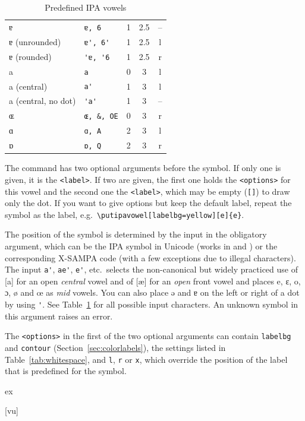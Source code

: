 \documentclass[a4paper,11pt]{article}
\newcommand\opt[1]{\texttt{#1}}
\begin{document}
\begin{table}[htbp]
\begin{longtable}{llccc}
		ɐ & \verb|ɐ, 6| & 1 & 2.5 & --\\
		ɐ (unrounded) & \verb|ɐ', 6'| & 1 & 2.5 & l\\
		ɐ (rounded) & \verb|'ɐ, '6| & 1 & 2.5 & r\\
		a & \verb|a| & 0 & 3 & l\\
		a (central) & \verb|a'| & 1 & 3 & l\\
		a (central, no dot) & \verb|'a'| & 1 & 3 & --\\
		ɶ & \verb|ɶ, &, OE| & 0 & 3 & r\\
		ɑ & \verb|ɑ, A| & 2 & 3 & l\\
		ɒ & \verb|ɒ, Q| & 2 & 3 & r\\
		\bottomrule
	\end{longtable}
	\caption{Predefined IPA vowels}
	\label{tab:ipavowels}
\end{table}

The command has two optional arguments before the symbol. If only one is given, it is the \texttt{<label>}. If two are given, the first one holds the \texttt{<options>} for this vowel and the second one the \texttt{<label>}, which may be empty (\verb|[]|) to draw only the dot. If you want to give options but keep the default label, repeat the symbol as the label, e.g.\ \verb|\putipavowel[labelbg=yellow][e]{e}|.

The position of the symbol is determined by the input in the obligatory argument, which can be the IPA symbol in Unicode (works in  and ) or the corresponding X-SAMPA code (with a few exceptions due to illegal characters).
The input \verb|a'|, \verb|ae'|, \verb|e'|, etc.\ selects the non-canonical but widely practiced use of [a] for an open \textit{central} vowel and of [æ] for an \textit{open} front vowel and places e, ɛ, o, ɔ, ø and œ as \textit{mid} vowels. You can also place ə and ɐ on the left or right of a dot by using \verb|'|.
See Table~\ref{tab:ipavowels} for all possible input characters. An unknown symbol in this argument raises an error.

The \texttt{<options>} in the first of the two optional arguments can contain \opt{labelbg} and \opt{contour} (Section~\ref{sec:colorlabels}), the settings listed in Table~\ref{tab:whitespace}, and \opt{l}, \opt{r} or \opt{x}, which override the position of the label that is predefined for the symbol.

\begin{tcblisting}{ex}
\begin{vowelchart}[width=4cm, font=\large]
  [vu]
\end{vowelchart}
\end{tcblisting}
\end{document}

